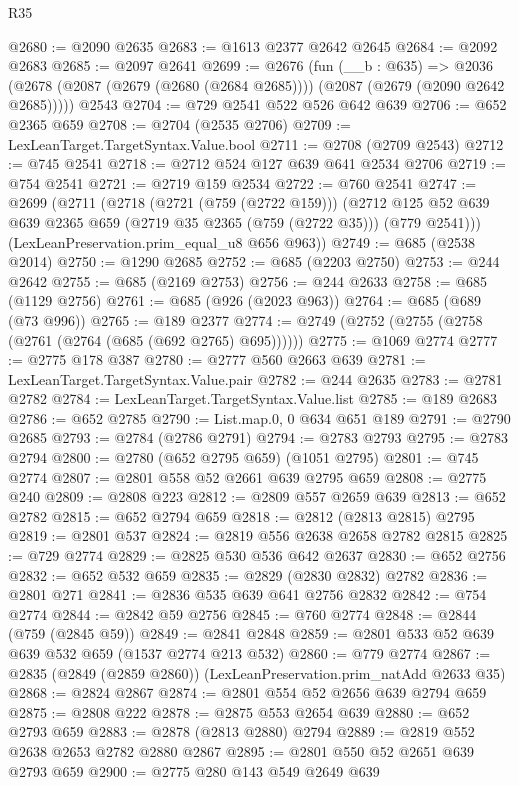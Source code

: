 \begin{lexlean}{R35}
\begin{coremodule}
@2680 := @2090 @2635
@2683 := @1613 @2377 @2642 @2645
@2684 := @2092 @2683
@2685 := @2097 @2641
@2699 := @2676
    (fun (__b : @635) =>
    @2036 (@2678 (@2087 (@2679 (@2680 (@2684 @2685)))) (@2087 (@2679 (@2090 @2642 @2685)))))
    @2543
@2704 := @729 @2541 @522 @526 @642 @639
@2706 := @652 @2365 @659
@2708 := @2704 (@2535 @2706)
@2709 := LexLeanTarget.TargetSyntax.Value.bool
@2711 := @2708 (@2709 @2543)
@2712 := @745 @2541
@2718 := @2712 @524 @127 @639 @641 @2534 @2706
@2719 := @754 @2541
@2721 := @2719 @159 @2534
@2722 := @760 @2541
@2747 := @2699
    (@2711
      (@2718
        (@2721 (@759 (@2722 @159)))
        (@2712 @125 @52 @639 @639 @2365 @659 (@2719 @35 @2365 (@759 (@2722 @35))) (@779 @2541)))
      (LexLeanPreservation.prim_equal_u8 @656 @963))
@2749 := @685 (@2538 @2014)
@2750 := @1290 @2685
@2752 := @685 (@2203 @2750)
@2753 := @244 @2642
@2755 := @685 (@2169 @2753)
@2756 := @244 @2633
@2758 := @685 (@1129 @2756)
@2761 := @685 (@926 (@2023 @963))
@2764 := @685 (@689 (@73 @996))
@2765 := @189 @2377
@2774 := @2749 (@2752 (@2755 (@2758 (@2761 (@2764 (@685 (@692 @2765) @695))))))
@2775 := @1069 @2774
@2777 := @2775 @178 @387
@2780 := @2777 @560 @2663 @639
@2781 := LexLeanTarget.TargetSyntax.Value.pair
@2782 := @244 @2635
@2783 := @2781 @2782
@2784 := LexLeanTarget.TargetSyntax.Value.list
@2785 := @189 @2683
@2786 := @652 @2785
@2790 := List.map.{0, 0} @634 @651 @189
@2791 := @2790 @2685
@2793 := @2784 (@2786 @2791)
@2794 := @2783 @2793
@2795 := @2783 @2794
@2800 := @2780 (@652 @2795 @659) (@1051 @2795)
@2801 := @745 @2774
@2807 := @2801 @558 @52 @2661 @639 @2795 @659
@2808 := @2775 @240
@2809 := @2808 @223
@2812 := @2809 @557 @2659 @639
@2813 := @652 @2782
@2815 := @652 @2794 @659
@2818 := @2812 (@2813 @2815) @2795
@2819 := @2801 @537
@2824 := @2819 @556 @2638 @2658 @2782 @2815
@2825 := @729 @2774
@2829 := @2825 @530 @536 @642 @2637
@2830 := @652 @2756
@2832 := @652 @532 @659
@2835 := @2829 (@2830 @2832) @2782
@2836 := @2801 @271
@2841 := @2836 @535 @639 @641 @2756 @2832
@2842 := @754 @2774
@2844 := @2842 @59 @2756
@2845 := @760 @2774
@2848 := @2844 (@759 (@2845 @59))
@2849 := @2841 @2848
@2859 := @2801 @533 @52 @639 @639 @532 @659 (@1537 @2774 @213 @532)
@2860 := @779 @2774
@2867 := @2835 (@2849 (@2859 @2860)) (LexLeanPreservation.prim_natAdd @2633 @35)
@2868 := @2824 @2867
@2874 := @2801 @554 @52 @2656 @639 @2794 @659
@2875 := @2808 @222
@2878 := @2875 @553 @2654 @639
@2880 := @652 @2793 @659
@2883 := @2878 (@2813 @2880) @2794
@2889 := @2819 @552 @2638 @2653 @2782 @2880 @2867
@2895 := @2801 @550 @52 @2651 @639 @2793 @659
@2900 := @2775 @280 @143 @549 @2649 @639

\end{coremodule}
\end{lexlean}

